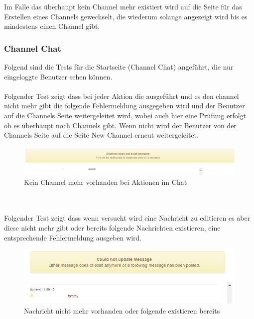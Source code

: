 \documentclass[11pt, a4paper, twoside]{article}   	%
\begin{document}
Im Falle das überhaupt kein Channel mehr existiert wird auf die Seite für das Erstellen eines Channels gewechselt, die wiederum solange angezeigt wird bis es mindestens einen Channel gibt.
\newpage

\subsubsection{Channel Chat}
Folgend sind die Tests für die Startseite (Channel Chat) angeführt, die nur eingeloggte Benutzer sehen können.\\\\
Folgender Test zeigt dass bei jeder Aktion die ausgeführt und es den channel nicht mehr gibt die folgende Fehlermeldung ausgegeben wird und der Benutzer auf die Channels Seite weitergeleitet wird, wobei auch hier eine Prüfung erfolgt ob es überhaupt noch Channels gibt. Wenn nicht wird der Benutzer von der Channels Seite auf die Seite New Channel erneut weitergeleitet.
\begin{figure}[h]
	\centering
	\includegraphics[scale=0.5]{images/start_channel_chat_no_channel_on_action.PNG}
	\caption
	{Kein Channel mehr vorhanden bei Aktionen im Chat}
\end{figure}\\\\

Folgender Test zeigt dass wenn versucht wird eine Nachricht zu editieren es aber diese nicht mehr gibt oder bereits folgende Nachrichten existieren, eine entsprechende Fehlermeldung ausgeben wird.
\begin{figure}[h]
	\centering
	\includegraphics[scale=0.5]{images/start_channel_chat_no_message_or_following.PNG}
	\caption
	{Nachricht nicht mehr vorhanden oder folgende existieren bereits}
\end{figure}\\\\
\end{document}
